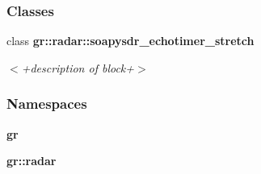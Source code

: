 \subsubsection*{Classes}
\begin{DoxyCompactItemize}
\item 
class {\bf gr\+::radar\+::soapysdr\+\_\+echotimer\+\_\+stretch}
\begin{DoxyCompactList}\small\item\em $<$+description of block+$>$ \end{DoxyCompactList}\end{DoxyCompactItemize}
\subsubsection*{Namespaces}
\begin{DoxyCompactItemize}
\item 
 {\bf gr}
\item 
 {\bf gr\+::radar}
\end{DoxyCompactItemize}
